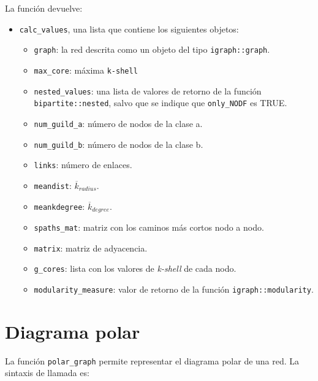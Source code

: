 La función devuelve:
\begin{itemize}
\item \texttt{calc\_values}, una lista que contiene los siguientes objetos:
   \begin{itemize}
   
\item \texttt{graph}: la red descrita como un objeto del tipo \texttt{igraph::graph}.

\item \texttt{max\_core}: máxima \texttt{k-shell}

\item \texttt{nested\_values}: una lista de valores de retorno de la función \texttt{bipartite::nested}, salvo que se indique que \texttt{only\_NODF} es TRUE.

\item \texttt{num\_guild\_a}: número de nodos de la clase a.

\item \texttt{num\_guild\_b}: número de nodos de la clase b.

\item \texttt{links}: número de enlaces.

\item \texttt{meandist}: $\overline {k}_{radius}$.

\item \texttt{meankdegree}:  $\overline {k}_{degree}$.

\item \texttt{spaths\_mat}: matriz con los caminos más cortos nodo a nodo.

\item \texttt{matrix}: matriz de adyacencia.

\item \texttt{g\_cores}: lista con los valores de \textit{k-shell} de cada nodo.

\item \texttt{modularity\_measure}: valor de retorno de la función \texttt{igraph::modularity}.
   \end{itemize}


\end{itemize}

\section{Diagrama polar}
\label{polar_plot}

La función \texttt{polar\_graph} permite representar el diagrama polar de una red. La sintaxis de llamada es:

